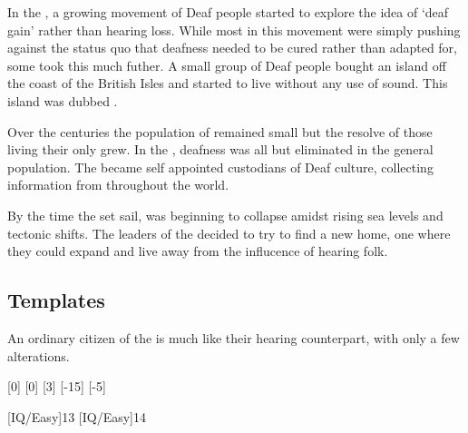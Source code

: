\documentclass[a4paper,twocolumn]{memoir}
\begin{document}
In the , a growing movement of Deaf people started to explore the
idea of `deaf gain' rather than hearing loss. While most in this movement were
simply pushing against the status quo that deafness needed to be cured rather
than adapted for, some took this much futher. A small group of Deaf people
bought an island off the coast of the British Isles and started to live without
any use of sound. This island was dubbed \deafisland.

Over the centuries the population of \deafisland remained small but the resolve
of those living their only grew. In the , deafness was all but
eliminated in the general population. The \deafies became self appointed
custodians of Deaf culture, collecting information from throughout the world.

By the time the \aventis set sail, \deafisland was beginning to collapse amidst rising
sea levels and tectonic shifts. The leaders of the \deafies decided to try to
find a new home, one where they could expand and live away from the influcence
of hearing folk.

\subsection{Templates}
\label{sec:templates-deafies}
An ordinary citizen of the \deafies is much like their hearing counterpart, with
only a few alterations.

\begin{lens}{}
  [0]
  [0]
  [3]
  [-15]
  [-5]

  [IQ/Easy]{13}
  [IQ/Easy]{14}
\end{lens}

\end{document}
